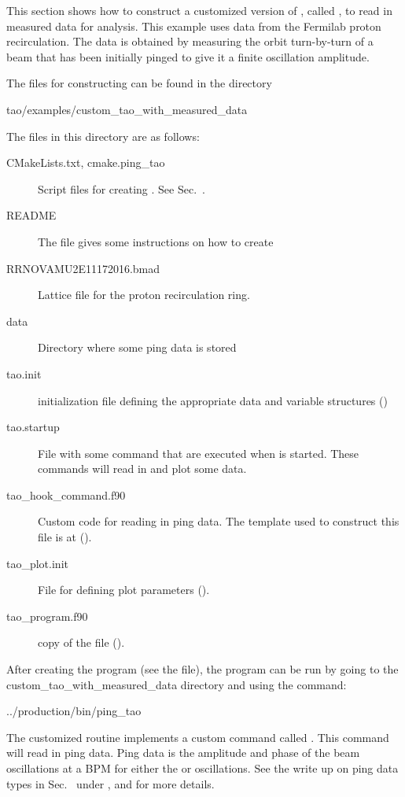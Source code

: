 {{{{This section shows how to construct a customized version of \tao, called , to read in
measured data for analysis. This example uses data from the Fermilab proton recirculation. The data
is obtained by measuring the orbit turn-by-turn of a beam that has been initially pinged to give it
a finite oscillation amplitude.

The files for constructing  can be found
in the directory
\begin{example}
  tao/examples/custom_tao_with_measured_data
\end{example}
The files in this directory are as follows:
\begin{description}
  \item[CMakeLists.txt, cmake.ping_tao] \Newline
Script files for creating . See Sec.~.
  \item[README] \Newline
The  file gives some instructions on how to create 
  \item[RRNOVAMU2E11172016.bmad] \Newline
Lattice file for the proton recirculation ring.
  \item[data] \Newline
Directory where some ping data is stored
  \item[tao.init] \Newline
\tao initialization file defining the appropriate data and variable structures ()
  \item[tao.startup] \Newline
File with some command that are executed when \tao is started. These commands will read in
and plot some data.
  \item[tao_hook_command.f90] \Newline
Custom code for reading in ping data. The template used to construct this file is at
 ().
  \item[tao_plot.init] \Newline
File for defining plot parameters ().
  \item[tao_program.f90] \Newline
copy of the  file ().
\end{description}

After creating the  program (see the  file), the program can be run by going
to the custom_tao_with_measured_data directory and using the command:
\begin{example}
	../production/bin/ping_tao
\end{example}

The customized  routine implements a custom command called
.  This command will read in ping data. Ping data is the amplitude and phase
of the beam oscillations at a BPM for either the  or  oscillations.
See the write up on ping data types in Sec.~ under ,
and  for more details.

}}}}
